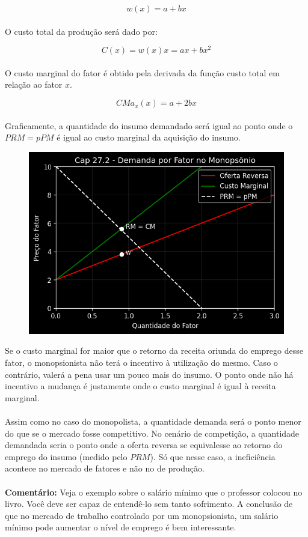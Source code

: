 \documentclass[a4paper,11pt,oneside]{book}
\theoremstyle{definition}
\theoremstyle{break}
\begin{document}
$$ w(x) = a + bx $$
\\
O custo total da produção será dado por:

$$ C(x) = w(x)x = ax + bx^2 $$
\\
O custo marginal do fator é obtido pela derivada da função custo total em relação ao fator $x$.

$$ CMa_x(x) = a + 2bx $$
\\
Graficamente, a quantidade do insumo demandado será igual ao ponto onde o $PRM = pPM$ é igual ao custo marginal da aquisição do insumo.

\begin{figure}[H]
\centering
\includegraphics[scale=0.75]{cap27_2-demanda_fatores_monopsonio.png}
\end{figure}

Se o custo marginal for maior que o retorno da receita oriunda do emprego desse fator, o monopsionista não terá o incentivo à utilização do mesmo. Caso o contrário, valerá a pena usar um pouco mais do insumo. O ponto onde não há incentivo a mudança é justamente onde o custo marginal é igual à receita marginal.
\\
\\
Assim como no caso do monopolista, a quantidade demanda será o ponto menor do que se o mercado fosse competitivo. No cenário de competição, a quantidade demandada seria o ponto onde a oferta reversa se equivalesse ao retorno do emprego do insumo (medido pelo $PRM$). Só que nesse caso, a ineficiência acontece no mercado de fatores e não no de produção.
\\
\\
\textbf{Comentário:} Veja o exemplo sobre o salário mínimo que o professor colocou no livro. Você deve ser capaz de entendê-lo sem tanto sofrimento. A conclusão de que no mercado de trabalho controlado por um monopsionista, um salário mínimo pode aumentar o nível de emprego é bem interessante.
\end{document}
